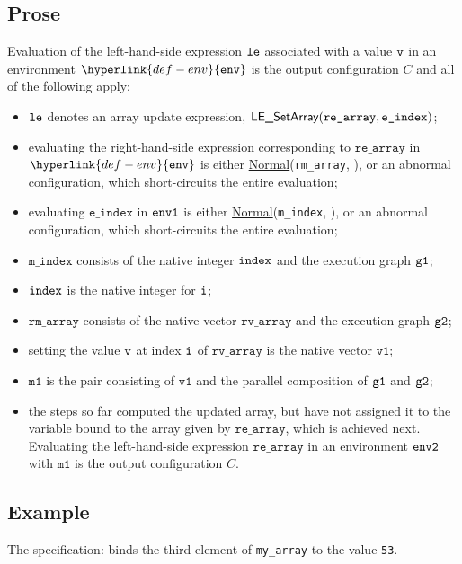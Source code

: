 \documentclass{book}
\newcommand\ProseOrAbnormal[0]{or an abnormal configuration, which short-circuits the entire evaluation}
\newcommand\Normal[0]{\hyperlink{def-normal}{\textsf{Normal}}}
\newcommand\env[0]{\hyperlink{def-env}{\texttt{env}}}
\newcommand\vvone[0]{\texttt{v1}}
\newcommand\vmone[0]{\texttt{m1}}
\newcommand\eindex[0]{\texttt{e\_index}}
\newcommand\mindex[0]{\texttt{m\_index}}
\newcommand\rearray[0]{\texttt{re\_array}}
\newcommand\rvarray[0]{\texttt{rv\_array}}
\newcommand\rmarray[0]{\texttt{rm\_array}}
\begin{document}
  \subsection{Prose}
  Evaluation of the left-hand-side expression $\texttt{le}$ associated with a
  value $\texttt{v}$ in an environment $\env$ is the output configuration $C$
  and all of the following apply:
  \begin{itemize}
  \item $\texttt{le}$ denotes an array update expression, $\LESetArray(\rearray, \eindex)$;
  \item evaluating the right-hand-side expression corresponding to $\rearray$ in $\env$
  is either \Normal(\rmarray, \envone), \ProseOrAbnormal;
  \item evaluating $\eindex$ in $\texttt{env1}$ is either \Normal(\mindex, \envtwo), \ProseOrAbnormal;
  \item $\mindex$ consists of the native integer $\texttt{index}$ and the execution graph $\texttt{g1}$;
  \item $\texttt{index}$ is the native integer for $\texttt{i}$;
  \item $\rmarray$ consists of the native vector $\rvarray$ and the execution graph $\texttt{g2}$;
  \item setting the value $\texttt{v}$ at index $\texttt{i}$ of $\rvarray$ is the native vector $\vvone$;
  \item $\vmone$ is the pair consisting of $\vvone$ and the parallel composition of $\texttt{g1}$ and $\texttt{g2}$;
  \item the steps so far computed the updated array, but have not assigned it to the variable
  bound to the array given by $\rearray$, which is achieved next.
  Evaluating the left-hand-side expression $\rearray$ in an environment $\texttt{env2}$ with $\vmone$
  is the output configuration $C$.
  \end{itemize}

  \subsection{Example}
  The specification:
  binds the third element of \texttt{my\_array} to the value \texttt{53}.


\end{document}
